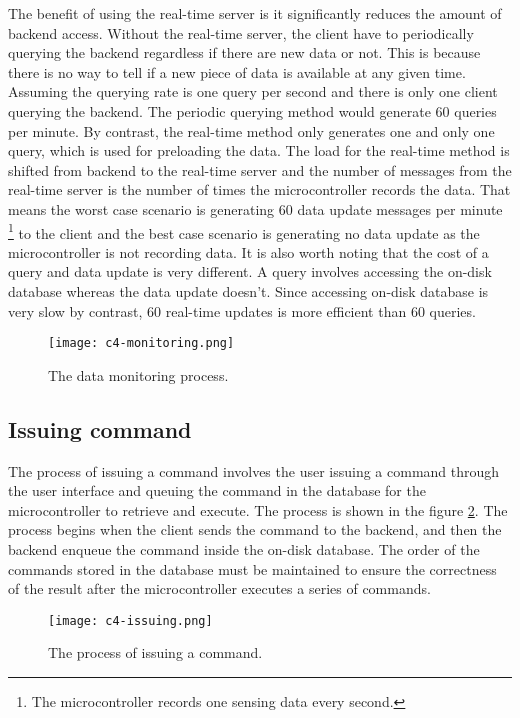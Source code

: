 \documentclass[../thesis.tex]{subfiles}
\begin{document}
The benefit of using the real-time server is it significantly reduces the amount of backend access. Without the real-time server, the client have to periodically querying the backend regardless if there are new data or not. This is because there is no way to tell if a new piece of data is available at any given time. Assuming the querying rate is one query per second and there is only one client querying the backend. The periodic querying method would generate 60 queries per minute. By contrast, the real-time method only generates one and only one query, which is used for preloading the data. The load for the real-time method is shifted from backend to the real-time server and the number of messages from the real-time server is the number of times the microcontroller records the data. That means the worst case scenario is generating 60 data update messages per minute \footnote{The microcontroller records one sensing data every second.} to the client and the best case scenario is generating no data update as the microcontroller is not recording data. It is also worth noting that the cost of a query and data update is very different. A query involves accessing the on-disk database whereas the data update doesn't. Since accessing on-disk database is very slow by contrast, 60 real-time updates is more efficient than 60 queries.

\begin{figure}[!ht]
	\centering
	\texttt{[image: c4-monitoring.png]}
	\caption{The data monitoring process.}
	\label{fig:monitoring}
\end{figure}

\subsection{Issuing command}

The process of issuing a command involves the user issuing a command through the user interface and queuing the command in the database for the microcontroller to retrieve and execute. The process is shown in the figure \ref{fig:issuing}. The process begins when the client sends the command to the backend, and then the backend enqueue the command inside the on-disk database. The order of the commands stored in the database must be maintained to ensure the correctness of the result after the microcontroller executes a series of commands.


\begin{figure}[!ht]
	\centering
	\texttt{[image: c4-issuing.png]}
	\caption{The process of issuing a command.}
	\label{fig:issuing}
\end{figure}
\end{document}
